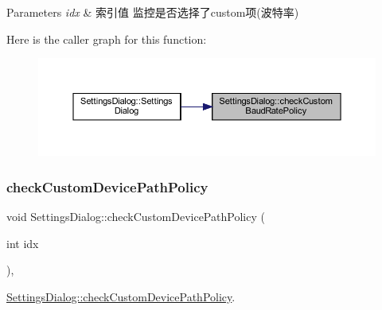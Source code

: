 \begin{DoxyParams}{Parameters}
{\em idx} & 索引值 监控是否选择了custom项(波特率) \\
\hline
\end{DoxyParams}
Here is the caller graph for this function\+:
\nopagebreak
\begin{figure}[H]
\begin{center}
\leavevmode
\includegraphics[width=350pt]{class_settings_dialog_aae0cd05c0c0204e11d9e4703ecf7b0a4_icgraph}
\end{center}
\end{figure}
\mbox{\label{class_settings_dialog_a5b561a34cba1fba972081978f3da0a4a}} 
\subsubsection{\texorpdfstring{checkCustomDevicePathPolicy}{checkCustomDevicePathPolicy}}
{\footnotesize\ttfamily void Settings\+Dialog\+::check\+Custom\+Device\+Path\+Policy (\begin{DoxyParamCaption}\item[{int}]{idx }\end{DoxyParamCaption})\hspace{0.3cm}{\ttfamily [private]}, {\ttfamily [slot]}}



\mbox{\hyperlink{class_settings_dialog_a5b561a34cba1fba972081978f3da0a4a}{Settings\+Dialog\+::check\+Custom\+Device\+Path\+Policy}}. 


